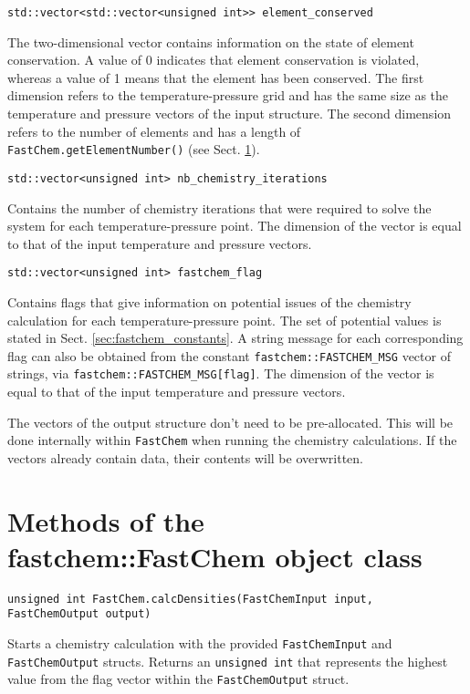 \documentclass[numbers=noenddot]{aux/fcmanual}
\newcommand{\fc}{\texttt{FastChem}\xspace}
\begin{document}
\lstinline!std::vector<std::vector<unsigned int>> element_conserved!
\begin{addmargin}[25pt]{0pt}
  The two-dimensional vector contains information on the state of element conservation. A value of 0 indicates that element conservation is violated, whereas a value of 1 means that the element has been conserved. The first dimension refers to the temperature-pressure grid and has the same size as the temperature and pressure vectors of the input structure. The second dimension refers to the number of elements and has a length of \lstinline!FastChem.getElementNumber()! (see Sect. \ref{sec:fastchem_methods}).
\end{addmargin}

\bigbreak

\lstinline!std::vector<unsigned int> nb_chemistry_iterations!
\begin{addmargin}[25pt]{0pt}
  Contains the number of chemistry iterations that were required to solve the system for each temperature-pressure point. The dimension of the vector is equal to that of the input temperature and pressure vectors.
\end{addmargin}

\bigbreak

\lstinline!std::vector<unsigned int> fastchem_flag!
\begin{addmargin}[25pt]{0pt}
  Contains flags that give information on potential issues of the chemistry calculation for each temperature-pressure point. The set of potential values is stated in Sect. \ref{sec:fastchem_constants}. A string message for each corresponding flag can also be obtained from the constant \lstinline!fastchem::FASTCHEM_MSG! vector of strings, via \lstinline!fastchem::FASTCHEM_MSG[flag]!. The dimension of the vector is equal to that of the input temperature and pressure vectors.
\end{addmargin}

\bigbreak

The vectors of the output structure don't need to be pre-allocated. This will be done internally within \fc when running the chemistry calculations. If the vectors already contain data, their contents will be overwritten.


\section{Methods of the fastchem::FastChem object class}
\label{sec:fastchem_methods}

\lstinline!unsigned int FastChem.calcDensities(FastChemInput input, FastChemOutput output)!
\begin{addmargin}[25pt]{0pt}
  Starts a chemistry calculation with the provided \lstinline!FastChemInput! and \lstinline!FastChemOutput! structs. Returns an \lstinline!unsigned int! that represents the highest value from the flag vector within the \lstinline!FastChemOutput! struct.
\end{addmargin}
\end{document}
